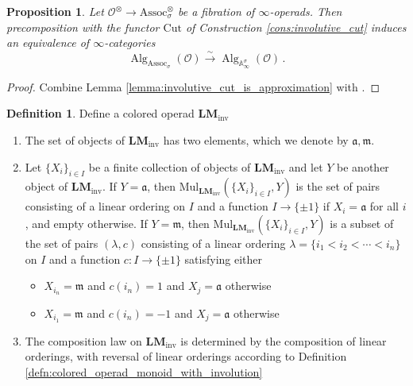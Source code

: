 \documentclass{article}
\DeclareMathOperator{\Alg}{Alg}
\renewcommand{\AA}{\mathbb{A}}
\newcommand{\Associnv}{\mathrm{Assoc}_\sigma}
\newtheorem{proposition}[equation]{Proposition}
\theoremstyle{definition}
\newtheorem{definition}[equation]{Definition}
\begin{document}
\begin{proposition}
    Let $ \mathcal{O}^\otimes \to \Associnv^\otimes $ be a fibration of $ \infty $-operads. 
    Then precomposition with the functor $ \mathrm{Cut} $ of Construction \ref{cons:involutive_cut} induces an equivalence of $ \infty $-categories
    \begin{equation*}
        \Alg_{\Associnv}(\mathcal{O}) \xrightarrow{\sim} \Alg_{\AA_\infty^\sigma}\left(\mathcal{O}\right)\,.
    \end{equation*}
\end{proposition}
\begin{proof}
    Combine Lemma \ref{lemma:involutive_cut_is_approximation} with \cite[Theorem 2.3.3.23]{LurHA}. 
\end{proof}
\begin{definition}\label{defn:inv_leftmod_operad}
    Define a colored operad $ \mathbf{LM}_\mathrm{inv} $
    \begin{enumerate}[label=(\roman*)]
        \item The set of objects of $ \mathbf{LM}_\mathrm{inv} $ has two elements, which we denote by $ \mathfrak{a}, \mathfrak{m} $. 
        \item Let $ \{X_i\}_{i \in I} $ be a finite collection of objects of $ \mathbf{LM}_{\mathrm{inv}} $ and let $ Y $ be another object of $ \mathbf{LM}_{\mathrm{inv}} $. 
        If $ Y = \mathfrak{a} $, then $ \mathrm{Mul}_{\mathbf{LM}_\mathrm{inv}} \left(\{X_i\}_{i \in I}, Y\right) $ is the set of pairs consisting of a linear ordering on $ I $ and a function $ I \to \{\pm 1\} $ if $ X_i = \mathfrak{a} $ for all $ i $, and empty otherwise. 
        If $ Y = \mathfrak{m} $, then $ \mathrm{Mul}_{\mathbf{LM}_\mathrm{inv}} \left(\{X_i\}_{i \in I}, Y\right) $ is a subset of the set of pairs $ (\lambda, c) $ consisting of a linear ordering $ \lambda = \{i_1 < i_2 < \cdots < i_n\} $ on $ I $ and a function $ c\colon I \to \{\pm 1 \} $ satisfying either 
        \begin{itemize}
            \item  $ X_{i_n} = \mathfrak{m} $ and $ c(i_n) = 1 $ and $ X_{j} = \mathfrak{a} $ otherwise
            \item  $ X_{i_1} = \mathfrak{m} $ and $ c(i_n) = -1 $ and $ X_{j} = \mathfrak{a} $ otherwise
        \end{itemize}
        \item The composition law on $ \mathbf{LM}_{\mathrm{inv}} $ is determined by the composition of linear orderings, with reversal of linear orderings according to Definition \ref{defn:colored_operad_monoid_with_involution} 
    \end{enumerate}
\end{definition} 
\end{document}
